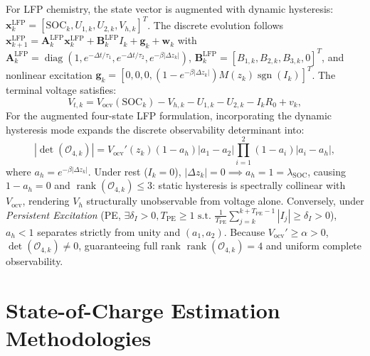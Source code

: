 \documentclass[balance,nocopyright,upint,varvw,hyphenate,barcolor=NavyBlue,nolists]{asmejour}
\begin{document}
For LFP chemistry, the state vector is augmented with dynamic hysteresis: $\mathbf{x}_k^{\text{LFP}} = [\text{SOC}_k, U_{1,k}, U_{2,k}, V_{h,k}]^T$. The discrete evolution follows $\mathbf{x}_{k+1}^{\text{LFP}} = \mathbf{A}_k^{\text{LFP}} \mathbf{x}_k^{\text{LFP}} + \mathbf{B}_k^{\text{LFP}} I_k + \mathbf{g}_k + \mathbf{w}_k$ with $\mathbf{A}_k^{\text{LFP}} = \operatorname{diag}(1, e^{-\Delta t/\tau_1}, e^{-\Delta t/\tau_2}, e^{-\beta|\Delta z_k|})$, $\mathbf{B}_k^{\text{LFP}} = [B_{1,k}, B_{2,k}, B_{3,k}, 0]^T$, and nonlinear excitation $\mathbf{g}_k = [0, 0, 0, (1 - e^{-\beta |\Delta z_k|}) M(z_k) \operatorname{sgn}(I_k)]^T$. The terminal voltage satisfies:
\begin{equation}\label{eqn:vt_lfp}
V_{t,k} = V_{\text{ocv}}(\text{SOC}_k) - V_{h,k} - U_{1,k} - U_{2,k} - I_k R_0 + v_k,
\end{equation}
For the augmented four-state LFP formulation, incorporating the dynamic hysteresis mode expands the discrete observability determinant into:
\begin{equation}\label{eqn:det_obs_lfp}
|\det(\mathcal{O}_{4,k})| = V_{\text{ocv}}'(z_k)(1 - a_h)|a_1 - a_2|\prod_{i=1}^2 (1 - a_i)|a_i - a_h|,
\end{equation}
where $a_h = e^{-\beta |\Delta z_k|}$. Under rest ($I_k = 0$), $|\Delta z_k| = 0 \implies a_h = 1 = \lambda_{\text{SOC}}$, causing $1 - a_h = 0$ and $\operatorname{rank}(\mathcal{O}_{4,k}) \le 3$: static hysteresis is spectrally collinear with $V_{\text{ocv}}$, rendering $V_h$ structurally unobservable from voltage alone. Conversely, under \emph{Persistent Excitation} (PE, $\exists \delta_I > 0, T_{\text{PE}} \ge 1 \text{ s.t. } \frac{1}{T_{\text{PE}}} \sum_{j=k}^{k+T_{\text{PE}}-1} |I_j| \ge \delta_I > 0$), $a_h < 1$ separates strictly from unity and $(a_1, a_2)$. Because $V_{\text{ocv}}' \ge \alpha > 0$, $\det(\mathcal{O}_{4,k}) \ne 0$, guaranteeing full rank $\operatorname{rank}(\mathcal{O}_{4,k}) = 4$ and uniform complete observability.

\section{State-of-Charge Estimation Methodologies}
\end{document}

